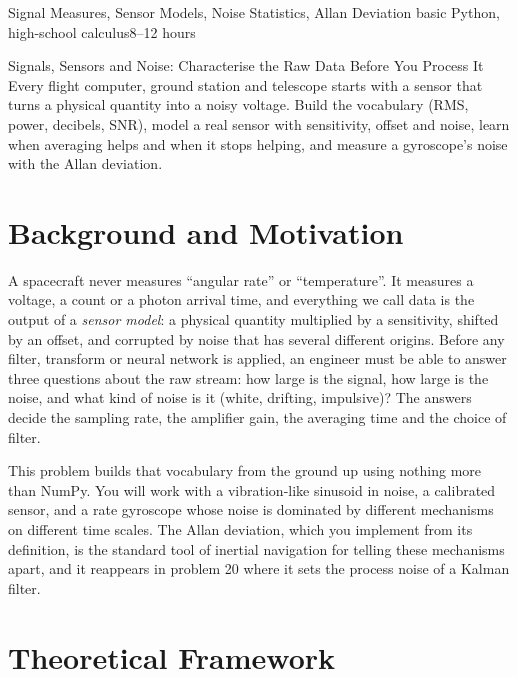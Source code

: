 \documentclass[11pt,a4paper]{article}
\begin{document}
%
{Signal Measures, Sensor Models, Noise Statistics, Allan Deviation}%
{basic Python, high-school calculus}{8--12 hours}

\begin{summarybox}{Signals, Sensors and Noise: Characterise the Raw Data Before You Process It}
Every flight computer, ground station and telescope starts with a sensor that turns a physical quantity into a noisy voltage. Build the vocabulary (RMS, power, decibels, SNR), model a real sensor with sensitivity, offset and noise, learn when averaging helps and when it stops helping, and measure a gyroscope's noise with the Allan deviation.
\end{summarybox}


\section*{Background and Motivation}
A spacecraft never measures ``angular rate'' or ``temperature''. It measures a voltage, a count or a photon arrival time, and everything we call data is the output of a \emph{sensor model}: a physical quantity multiplied by a sensitivity, shifted by an offset, and corrupted by noise that has several different origins. Before any filter, transform or neural network is applied, an engineer must be able to answer three questions about the raw stream: how large is the signal, how large is the noise, and what kind of noise is it (white, drifting, impulsive)? The answers decide the sampling rate, the amplifier gain, the averaging time and the choice of filter.

This problem builds that vocabulary from the ground up using nothing more than NumPy. You will work with a vibration-like sinusoid in noise, a calibrated sensor, and a rate gyroscope whose noise is dominated by different mechanisms on different time scales. The Allan deviation, which you implement from its definition, is the standard tool of inertial navigation for telling these mechanisms apart, and it reappears in problem 20 where it sets the process noise of a Kalman filter.

\section*{Theoretical Framework}
\end{document}
